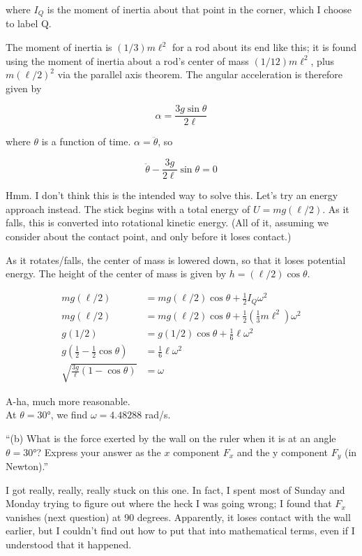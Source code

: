 \documentclass[8.01x]{subfiles}
\begin{document}
where $I_Q$ is the moment of inertia about that point in the corner, which I choose to label Q.

The moment of inertia is $(1/3) m \ell^2$ for a rod about its end like this; it is found using the moment of inertia about a rod's center of mass $(1/12) m \ell^2$, plus $m (\ell/2)^2$ via the parallel axis theorem. The angular acceleration is therefore given by

\begin{equation}
\alpha = \frac{3 g \sin \theta}{2 \ell}
\end{equation}

where $\theta$ is a function of time. $\alpha = \ddot{\theta}$, so

\begin{equation}
\ddot{\theta} - \frac{3 g}{2 \ell} \sin \theta = 0 
\end{equation}

Hmm. I don't think this is the intended way to solve this. Let's try an energy approach instead. The stick begins with a total energy of $U = m g (\ell/2)$. As it falls, this is converted into rotational kinetic energy. (All of it, assuming we consider about the contact point, and only before it loses contact.)

As it rotates/falls, the center of mass is lowered down, so that it loses potential energy. The height of the center of mass is given by $h = (\ell/2) \cos \theta$.

\begin{align}
m g (\ell/2) &= m g (\ell/2) \cos \theta + \frac{1}{2} I_Q \omega^2\\
m g (\ell/2) &= m g (\ell/2) \cos \theta + \frac{1}{2} \left(\frac{1}{3} m \ell^2\right) \omega^2\\
g (1/2) &= g (1/2) \cos \theta + \frac{1}{6} \ell \omega^2\\
g \left( \frac{1}{2} - \frac{1}{2} \cos \theta\right) &= \frac{1}{6} \ell \omega^2\\
\sqrt{\frac{3 g}{\ell} \left( 1 - \cos \theta\right)} &= \omega
\end{align}

A-ha, much more reasonable.\\
At $\theta = \ang{30}$, we find $\omega = 4.48288$ rad/s.

``(b) What is the force exerted by the wall on the ruler when it is at an angle $\theta=\ang{30}$? Express your answer as the $x$ component $F_x$ and the y component $F_y$ (in Newton).''

I got really, really, really stuck on this one. In fact, I spent most of Sunday and Monday trying to figure out where the heck I was going wrong; I found that $F_x$ vanishes (next question) at 90 degrees. Apparently, it loses contact with the wall earlier, but I couldn't find out how to put that into mathematical terms, even if I understood that it happened.
\end{document}
